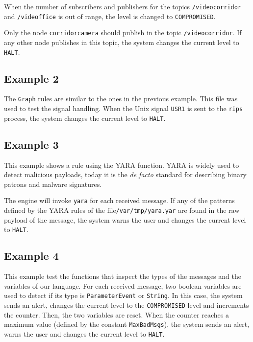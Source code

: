 \documentclass[a4paper]{article}
\begin{document}
When the number of subscribers and publishers
for the topics \texttt{/videocorridor} and \texttt{/videoffice}
is out of range, the level is changed to \texttt{COMPROMISED}.

Only the node \texttt{corridorcamera} should publish in the
topic \texttt{/videocorridor}. If any other node publishes in this topic,
the system changes the current level to \texttt{HALT}.



\subsection{Example 2}

The \texttt{Graph} rules are similar to the ones in the previous example.
This file was used to test the signal handling. When the Unix signal
\texttt{USR1} is sent to the \texttt{rips} process, the system changes
the current level to \texttt{HALT}.




\subsection{Example 3}

This example shows a rule using the YARA function. YARA is widely
used to detect malicious payloads, today it is the \textit{de facto}
standard for describing binary patrons and malware signatures.

The engine will invoke \texttt{yara} for each received message. If any of the
patterns defined by the YARA rules of the file\texttt{/var/tmp/yara.yar}
are found in the raw payload of the message,
the system warns the user and
changes the current level to \texttt{HALT}.



\subsection{Example 4}

This example test the functions that inspect the types of the messages
and the variables of our language. For each received message, two boolean
variables are used to detect if its type is \texttt{ParameterEvent} or
\texttt{String}. In this case,
the system sends an alert,
changes the current level to the \texttt{COMPROMISED} level and
increments the counter. Then, the two variables are reset.
When the counter reaches a maximum value (defined by the constant
\texttt{MaxBadMsgs}), the system sends an alert, warns the user and
changes the current level to \texttt{HALT}.
\end{document}
